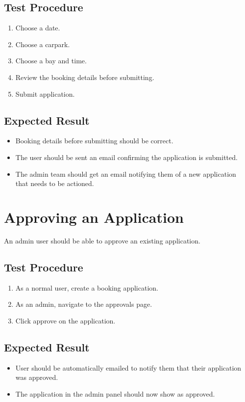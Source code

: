 \documentclass[a4paper, draft]{article}
\begin{document}
\subsection{Test Procedure}
\begin{enumerate}
    \item Choose a date.
    \item Choose a carpark.
    \item Choose a bay and time.
    \item Review the booking details before submitting.
    \item Submit application.
\end{enumerate}

\subsection{Expected Result}
\begin{itemize}
    \item Booking details before submitting should be correct.
    \item The user should be sent an email confirming the application is submitted.
    \item The admin team should get an email notifying them of a new application that needs to be actioned.
\end{itemize}

\newpage
\section{Approving an Application}
An admin user should be able to approve an existing application.

\subsection{Test Procedure}
\begin{enumerate}
    \item As a normal user, create a booking application.
    \item As an admin, navigate to the approvals page.
    \item Click approve on the application.
\end{enumerate}

\subsection{Expected Result}
\begin{itemize}
    \item User should be automatically emailed to notify them that their application was approved.
    \item The application in the admin panel should now show as approved.
\end{itemize}
\end{document}
